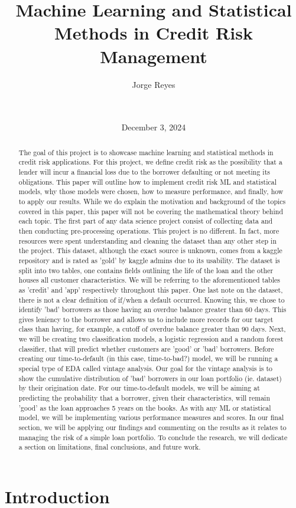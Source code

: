 \documentclass[12pt]{article}
\title{Machine Learning and Statistical Methods in Credit Risk Management\\[0.5cm]}
\author{Jorge Reyes \\[0.25cm] \text{University of Tennessee, Knoxville} \\[0.25cm] \text{COSC 522 Machine Learning} \\[0.25cm]}
\date{December 3, 2024}
\begin{document}
\maketitle
\clearpage %

\tableofcontents
\newpage

\section{Introduction}
\begin{abstract}
The goal of this project is to showcase machine learning and statistical methods in credit risk applications. 
For this project, we define credit risk as the possibility that a lender will incur a financial loss due to the borrower defaulting or not meeting its obligations. 
This paper will outline how to implement credit risk ML and statistical models, why those models were chosen, how to measure performance, and finally, how to apply our results.
While we do explain the motivation and background of the topics covered in this paper, this paper will not be covering the mathematical theory behind each topic.
The first part of any data science project consist of collecting data and then conducting pre-processing operations. This project is no different.
In fact, more resources were spent understanding and cleaning the dataset than any other step in the project.
This dataset, although the exact source is unknown, comes from a kaggle repository and is rated as 'gold' by kaggle admins due to its usability.
The dataset is split into two tables, one contains fields outlining the life of the loan and the other houses all customer characteristics.
We will be referring to the aforementioned tables as 'credit' and 'app' respectively throughout this paper.
One last note on the dataset, there is not a clear definition of if/when a default occurred.
Knowing this, we chose to identify 'bad' borrowers as those having an overdue balance greater than 60 days.
This gives leniency to the borrower and allows us to include more records for our target class than having, for example, a cutoff of overdue balance greater than 90 days. 
Next, we will be creating two classification models, a logistic regression and a random forest classifier, that will predict whether customers are 'good' or 'bad' borrowers.
Before creating our time-to-default (in this case, time-to-bad?) model, we will be running a special type of EDA called vintage analysis.
Our goal for the vintage analysis is to show the cumulative distribution of 'bad' borrowers in our loan portfolio (ie. dataset) by their origination date.
For our time-to-default models, we will be aiming at predicting the probability that a borrower, given their characteristics, will remain 'good' as the loan approaches 5 years on the books.
As with any ML or statistical model, we will be implementing various performance measures and scores.
In our final section, we will be applying our findings and commenting on the results as it relates to managing the risk of a simple loan portfolio. 
To conclude the research, we will dedicate a section on limitations, final conclusions, and future work. 
\end{abstract}
\newpage
\end{document}
